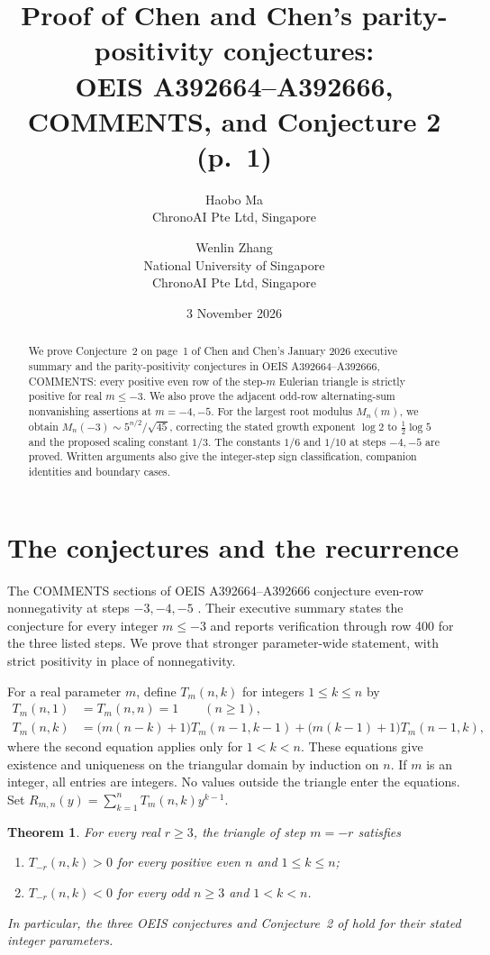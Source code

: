 \documentclass[11pt]{article}
\title{Proof of Chen and Chen's parity-positivity conjectures:\\
OEIS A392664--A392666, COMMENTS, and Conjecture 2 (p.~1)}
\author{Haobo Ma\\\small ChronoAI Pte Ltd, Singapore
\and Wenlin Zhang\\\small National University of Singapore\\
\small ChronoAI Pte Ltd, Singapore}
\date{3 November 2026}
\newtheorem{theorem}{Theorem}
\begin{document}
\maketitle
\begin{abstract}
We prove Conjecture~2 on page~1 of Chen and Chen's January 2026
executive summary and the parity-positivity conjectures in OEIS
A392664--A392666, COMMENTS: every positive even row of the step-$m$
Eulerian triangle is strictly positive for real $m\leq-3$.
We also prove the adjacent odd-row alternating-sum nonvanishing
assertions at $m=-4,-5$. For the largest root modulus $M_n(m)$,
we obtain $M_n(-3)\sim5^{n/2}/\sqrt{45}$, correcting the stated
growth exponent $\log2$ to $\tfrac12\log5$ and the proposed scaling
constant $1/3$. The constants $1/6$ and $1/10$ at steps $-4,-5$
are proved. Written arguments also give the integer-step sign
classification, companion identities and boundary cases.
\end{abstract}

\section{The conjectures and the recurrence}
The COMMENTS sections of OEIS A392664--A392666 conjecture
even-row nonnegativity at steps $-3,-4,-5$ \cite{oeis3,oeis4,oeis5}.
Their executive summary states the conjecture for every integer $m\leq-3$
\cite[p.~1, Conjecture~2]{chen} and reports verification through row 400
for the three listed steps. We prove that stronger parameter-wide statement,
with strict positivity in place of nonnegativity.

For a real parameter $m$, define $T_m(n,k)$ for integers $1\leq k\leq n$ by
\begin{align}
 T_m(n,1)&=T_m(n,n)=1 \qquad(n\geq1),\label{eq:boundary}\\
 T_m(n,k)&=\bigl(m(n-k)+1\bigr)T_m(n-1,k-1)
          +\bigl(m(k-1)+1\bigr)T_m(n-1,k),\label{eq:recurrence}
\end{align}
where the second equation applies only for $1<k<n$.
These equations give existence and uniqueness on the triangular domain
by induction on $n$. If $m$ is an integer, all entries are integers.
No values outside the triangle enter the equations.
Set $R_{m,n}(y)=\sum_{k=1}^n T_m(n,k)y^{k-1}$.

\begin{theorem}\label{thm:main}
For every real $r\geq3$, the triangle of step $m=-r$ satisfies
\begin{enumerate}
\item $T_{-r}(n,k)>0$ for every positive even $n$ and $1\leq k\leq n$;
\item $T_{-r}(n,k)<0$ for every odd $n\geq3$ and $1<k<n$.
\end{enumerate}
In particular, the three OEIS conjectures and Conjecture~2 of
\cite{chen} hold for their stated integer parameters.
\end{theorem}
\end{document}
